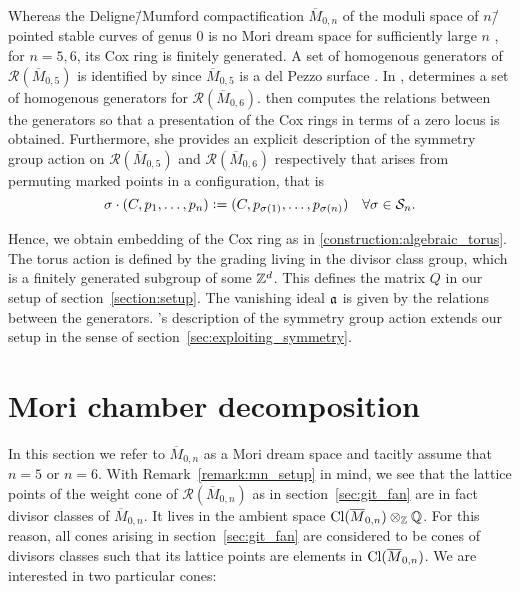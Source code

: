 \begin{remark}
	\label{remark:mn_setup}
	Whereas the Deligne\=/Mumford compactification $\overline{M}_{0,n}$ of the moduli space of $n$\=/pointed stable curves of genus $0$ is no Mori dream space for sufficiently large $n$ \cite{mn_is_not_a_mori_dream_space}, for $n=5,6$, its Cox ring is finitely generated. A set of homogenous generators of $\mathcal{R}(\overline{M}_{0,5})$ is identified by \cite{cox_ring_del_pezzo_surface} since $\overline{M}_{0,5}$ is a del Pezzo surface \cite{bernal}. In \cite{cox_ring_of_msix}, \citeauthor{cox_ring_of_msix} determines a set of homogenous generators for $\mathcal{R}(\overline{M}_{0,6})$. \citeauthor{bernal} \cite{bernal} then computes the relations between the generators so that a presentation of the Cox rings in terms of a zero locus is obtained. Furthermore, she provides an explicit description of the symmetry group action on $\mathcal{R}(\overline{M}_{0,5})$ and $\mathcal{R}(\overline{M}_{0,6})$ respectively that arises from permuting marked points in a configuration, that is 
	$$\sigma\cdot(C,p_1,\dots,p_n) \mathrel{\mathop:}= (C,p_{\sigma(1)},\dots,p_{\sigma(n)})\quad \forall\sigma\in \mathcal{S}_n.$$
	
	Hence, we obtain embedding of the Cox ring as in \ref{construction:algebraic_torus}. The torus action is defined by the grading living in the divisor class group, which is a finitely generated subgroup of some $\mathbb{Z}^d$. This defines the matrix $Q$ in our setup of section~\ref{section:setup}. The vanishing ideal $\mathfrak{a}$ is given by the relations between the generators. \citeauthor{bernal}'s description of the symmetry group action extends our setup in the sense of section~\ref{sec:exploiting_symmetry}.
\end{remark}

\section{Mori chamber decomposition}

In this section we refer to $\overline{M}_{0,n}$ as a Mori dream space and tacitly assume that $n=5$ or $n=6$. With Remark~\ref{remark:mn_setup} in mind, we see that the lattice points of the weight cone of $\mathcal{R}(\overline{M}_{0,n})$ as in section~\ref{sec:git_fan} are in fact divisor classes of $\overline{M}_{0,n}$. It lives in the ambient space $\text{Cl}(\overline{M}_{0,n}) \otimes_{\mathbb{Z}} \mathbb{Q}$. For this reason, all cones arising in section~\ref{sec:git_fan} are considered to be cones of divisors classes such that its lattice points are elements in $\text{Cl}(\overline{M}_{0,n})$. We are interested in two particular cones:

